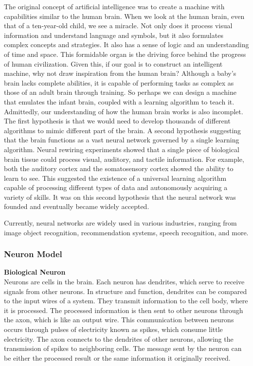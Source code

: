 \documentclass{article}
\begin{document}
    The original concept of artificial intelligence was to create a machine with capabilities similar to the human brain. When we look at the human brain, even that of a ten-year-old child, we see a miracle. Not only does it process visual information and understand language and symbols, but it also formulates complex concepts and strategies. It also has a sense of logic and an understanding of time and space. This formidable organ is the driving force behind the progress of human civilization. Given this, if our goal is to construct an intelligent machine, why not draw inspiration from the human brain? Although a baby's brain lacks complete abilities, it is capable of performing tasks as complex as those of an adult brain through training. So perhaps we can design a machine that emulates the infant brain, coupled with a learning algorithm to teach it. Admittedly, our understanding of how the human brain works is also incomplet. The first hypothesis is that we would need to develop thousands of different algorithms to mimic different part of the brain. A second hypothesis suggesting that the brain functions as a vast neural network governed by a single learning algorithm. Neural rewiring experiments showed that a single piece of biological brain tissue could process visual, auditory, and tactile information. For example, both the auditory cortex and the somatosensory cortex showed the ability to learn to see. This suggested the existence of a universal learning algorithm capable of processing different types of data and autonomously acquiring a variety of skills. It was on this second hypothesis that the neural network was founded and eventually became widely accepted.


    Currently, neural networks are widely used in various industries, ranging from image object recognition, recommendation systems, speech recognition, and more.



    \newpage
	\subsubsection{Neuron Model}

    \textbf{Biological Neuron}\\
    Neurons are cells in the brain. Each neuron has dendrites, which serve to receive signals from other neurons. In structure and function, dendrites can be compared to the input wires of a system. They transmit information to the cell body, where it is processed. The processed information is then sent to other neurons through the axon, which is like an output wire. This communication between neurons occurs through pulses of electricity known as spikes, which consume little electricity. The axon connects to the dendrites of other neurons, allowing the transmission of spikes to neighboring cells. The message sent by the neuron can be either the processed result or the same information it originally received.
\end{document}
